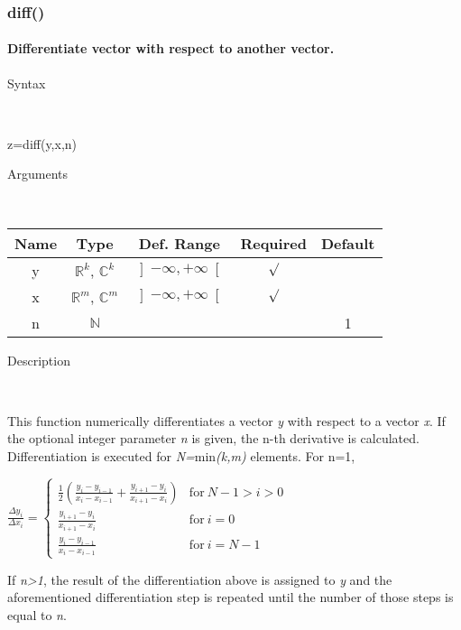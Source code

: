 \newpage
\subsubsection*{\hypertarget{diff}{}{\Large diff()}}


\paragraph{\label{par:Differentiate}Differentiate vector with respect to another
vector.}

\begin{description}
\item [Syntax]~
\end{description}
z=diff(y,x,n)

\begin{description}
\item [Arguments]~
\end{description}
\begin{tabular}{|c|c|c|c|c|}
\hline 
Name&
Type&
Def. Range&
Required&
Default\tabularnewline
\hline
\hline 
y&
$\mathbb{R}^{k}$, $\mathbb{C}^{k}$&
$\left]-\infty,+\infty\right[$&
$\surd$&
\tabularnewline
\hline 
x&
$\mathbb{R}^{m}$, $\mathbb{C}^{m}$&
$\left]-\infty,+\infty\right[$&
$\surd$&
\tabularnewline
\hline 
n&
$\mathbb{N}$&
&
&
1\tabularnewline
\hline
\end{tabular}

\begin{description}
\item [Description]~
\end{description}
This function numerically differentiates a vector \textit{y} with
respect to a vector \textit{x}. If the optional integer parameter
\textit{n} is given, the n-th derivative is calculated. Differentiation
is executed for \textit{N=}min\textit{(k,m)} elements. For n=1,

\medskip{}
${\displaystyle \frac{\Delta y_{i}}{\Delta x_{i}}}=$$\left\{ \begin{array}{cc}
{\displaystyle \frac{1}{2}\left(\frac{y_{i}-y_{i-1}}{x_{i}-x_{i-1}}+\frac{y_{i+1}-y_{i}}{x_{i+1}-x_{i}}\right)} & \textrm{for}\: N-1>i>0\\
{\displaystyle \frac{y_{i+1}-y_{i}}{x_{i+1}-x_{i}}} & \textrm{for}\: i=0\\
{\displaystyle \frac{y_{i}-y_{i-1}}{x_{i}-x_{i-1}}} & \textrm{for}\: i=N-1\end{array}\right.$
\medskip{}

If \textit{n>1}, the result of the differentiation above
is assigned to \textit{y} and the aforementioned differentiation step
is repeated until the number of those steps is equal to \textit{n}.

